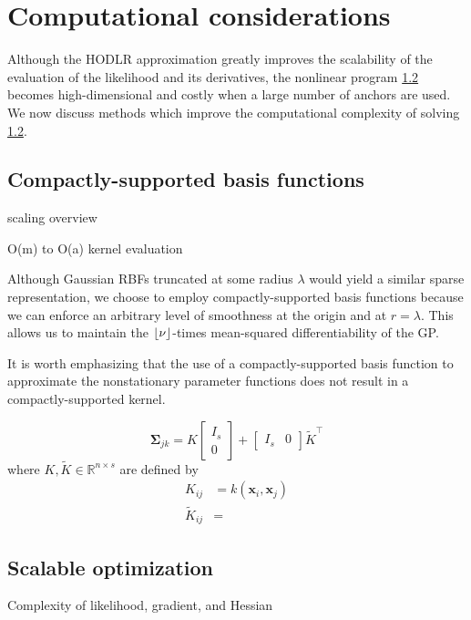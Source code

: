 \documentclass{article}
\newcommand{\mat}[1]{\begin{bmatrix}#1\end{bmatrix}}
\newcommand{\R}{\mathbb{R}}
\DeclarePairedDelimiter\floor{\lfloor}{\rfloor}
\numberwithin{equation}{section}
\begin{document}

\section{Computational considerations}
Although the HODLR approximation greatly improves the scalability of the evaluation of the likelihood and its derivatives, the nonlinear program \ref{} becomes high-dimensional and costly when a large number of anchors are used. We now discuss methods which improve the computational complexity of solving \ref{}.

\subsection{Compactly-supported basis functions}
scaling overview

O(m) to O(a) kernel evaluation

Although Gaussian RBFs truncated at some radius $\lambda$ would yield a similar sparse representation, we choose to employ compactly-supported basis functions because we can enforce an arbitrary level of smoothness at the origin and at $r=\lambda$. This allows us to maintain the $\floor{\nu}$-times mean-squared differentiability of the GP.

It is worth emphasizing that the use of a compactly-supported basis function to approximate the nonstationary parameter functions does not result in a compactly-supported kernel.

\begin{equation}
  \bm{\Sigma}_{jk} = K \mat{I_s \\ 0} + \mat{I_s & 0}\tilde{K}^\top
\end{equation}
where $K, \tilde{K} \in \R^{n \times s}$ are defined by
\begin{align*}
  K_{ij} &= k(\mathbf{x}_i, \mathbf{x}_j) \\
  \tilde{K}_{ij} &=
\end{align*}

\subsection{Scalable optimization}
Complexity of likelihood, gradient, and Hessian
\end{document}
